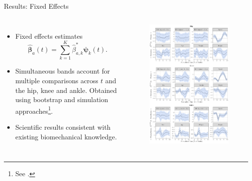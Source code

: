 \documentclass[aspectratio=128,xcolor=dvipsnames, notes]{beamer}
\newcommand{\1}{\mathbf{1}}
\newcommand{\boldbeta}{\boldsymbol{\beta}}
\begin{document}
\begin{frame}{Results: Fixed Effects}

    \begin{columns}[c]
    \small
    \begin{itemize}
        \item Fixed effects estimates $$\widehat{\boldbeta}_a(t) = \sum_{k=1}^K \widehat{\beta}_{a, k}^* \boldsymbol{\psi}_k (t).$$
        \item Simultaneous bands account for multiple comparisons across $t$ and the hip, knee and ankle. Obtained using bootstrap and simulation approaches\footnote{\scriptsize See \textcite{faraway_regression_1997, ruppert_semiparametric_2003, crainiceanu_bootstrap-based_2012, cui_fast_2022}.}.
        \item Scientific results consistent with existing biomechanical knowledge.
    \end{itemize}
    \begin{figure}
    \centering
    \includegraphics[width=1\linewidth]{figures/fixef_coef_plot.pdf}
\end{figure}
    \end{columns}
\end{frame}
\end{document}
